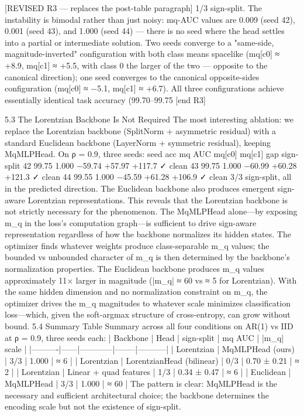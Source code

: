 [REVISED R3 — replaces the post-table paragraph]
1/3 sign-split. The instability is bimodal rather than just noisy: mq-AUC values are 0.009 (seed 42), 0.001 (seed 43), and 1.000 (seed 44) — there is no seed where the head settles into a partial or intermediate solution. Two seeds converge to a "same-side, magnitude-inverted" configuration with both class means spacelike (mq[c0] ≈ +8.9, mq[c1] ≈ +5.5, with class 0 the larger of the two — opposite to the canonical direction); one seed converges to the canonical opposite-sides configuration (mq[c0] ≈ −5.1, mq[c1] ≈ +6.7). All three configurations achieve essentially identical task accuracy (99.70–99.75%
[end R3]

5.3 The Lorentzian Backbone Is Not Required
The most interesting ablation: we replace the Lorentzian backbone (SplitNorm + asymmetric residual) with a standard Euclidean backbone (LayerNorm + symmetric residual), keeping MqMLPHead. On ρ = 0.9, three seeds:
seed
acc
mq AUC
mq[c0]
mq[c1]
gap
sign-split
42
99.75%
1.000
−59.74
+57.97
+117.7
✓ clean
43
99.75%
1.000
−60.99
+60.28
+121.3
✓ clean
44
99.55%
1.000
−45.59
+61.28
+106.9
✓ clean
3/3 sign-split, all in the predicted direction. The Euclidean backbone also produces emergent sign-aware Lorentzian representations.
This reveals that the Lorentzian backbone is not strictly necessary for the phenomenon. The MqMLPHead alone—by exposing m_q in the loss's computation graph—is sufficient to drive sign-aware representation regardless of how the backbone normalizes its hidden states. The optimizer finds whatever weights produce class-separable m_q values; the bounded vs unbounded character of m_q is then determined by the backbone's normalization properties.
The Euclidean backbone produces m_q values approximately 11× larger in magnitude (|m_q| ≈ 60 vs ≈ 5 for Lorentzian). With the same hidden dimension and no normalization constraint on m_q, the optimizer drives the m_q magnitudes to whatever scale minimizes classification loss—which, given the soft-argmax structure of cross-entropy, can grow without bound.
5.4 Summary Table
Summary across all four conditions on AR(1) vs IID at ρ = 0.9, three seeds each:
| Backbone | Head | sign-split | mq AUC | |m_q| scale | |----------|------|------------|--------|-----------| | Lorentzian | MqMLPHead (ours) | 3/3 | 1.000 | ≈ 6 | | Lorentzian | LorentzianHead (bilinear) | 0/3 | 0.70 ± 0.21 | ≈ 2 | | Lorentzian | Linear + quad features | 1/3 | 0.34 ± 0.47 | ≈ 6 | | Euclidean | MqMLPHead | 3/3 | 1.000 | ≈ 60 |
The pattern is clear: MqMLPHead is the necessary and sufficient architectural choice; the backbone determines the encoding scale but not the existence of sign-split.

